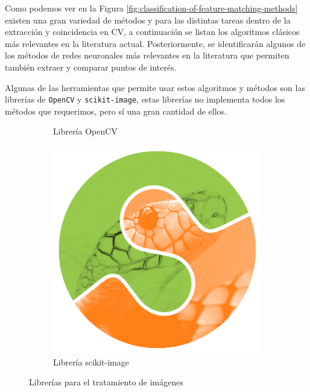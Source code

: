 Como podemos ver en la Figura \ref{fig:classification-of-feature-matching-methods} existen una gran variedad de métodos y para las distintas tareas dentro de la extracción y coincidencia en \acrfull{CV}, a continuación se listan los algoritmos clásicos más relevantes en la literatura actual. Posteriormente, se identificarán algunos de los métodos de redes neuronales más relevantes en la literatura que permiten también extraer y comparar puntos de interés.



Algunas de las herramientas que permite usar estos algoritmos y métodos son las librerías de \texttt{OpenCV} y \texttt{scikit-image}, estas librerías no implementa todos los métodos que requerimos, pero sí una gran cantidad de ellos.

\begin{figure}[H]
    \centering
    \begin{subfigure}{.25\linewidth}
        \centerline{}
        \caption{Librería OpenCV}
        \label{subfig:opencv}
    \end{subfigure} 
    \hspace{0.10\textwidth} %
    \begin{subfigure}{.25\linewidth}
        \includegraphics[width=\linewidth]{figures/assets/scikit-image.png}
        \caption{Librería scikit-image}
        \label{subfig:scikit-image}
    \end{subfigure}

    \caption{Librerías para el tratamiento de imágenes}
    \label{fig:libs-images}
\end{figure}


